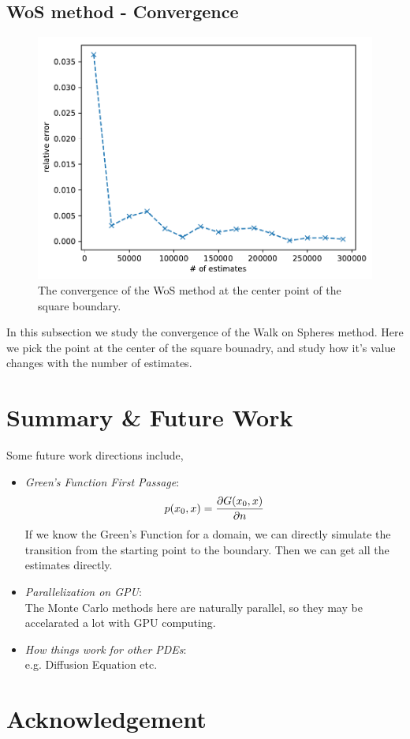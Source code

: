 \documentclass[aps, prl, reprint, groupedaddress]{revtex4-1}
\begin{document}
\subsection{WoS method - Convergence}

\begin{figure}[htbp]
    \centering
    \includegraphics[width=.4\textwidth]{./figs/err_es}
    \caption{\label{fig:err_es} The convergence of the WoS method at the center point of the square boundary.}
\end{figure}

In this subsection we study the convergence of the Walk on Spheres method. Here we pick the point at the center of the square bounadry, and study how it's value changes with the number of estimates.

\section{Summary \& Future Work}


Some future work directions include,
\begin{itemize}
    \item \emph{Green's Function First Passage}:
    \begin{equation*}
        p(x_0, x) = \pdv{G(x_0, x)}{n}
    \end{equation*}
    If we know the Green's Function for a domain, we can directly simulate the transition from the starting point to the boundary. Then we can get all the estimates directly.
    \item \emph{Parallelization on GPU}:\\
    The Monte Carlo methods here are naturally parallel, so they may be accelarated a lot with GPU computing.
    \item \emph{How things work for other PDEs}:\\
    e.g. Diffusion Equation etc.
\end{itemize}

\section{Acknowledgement}


\end{document}
